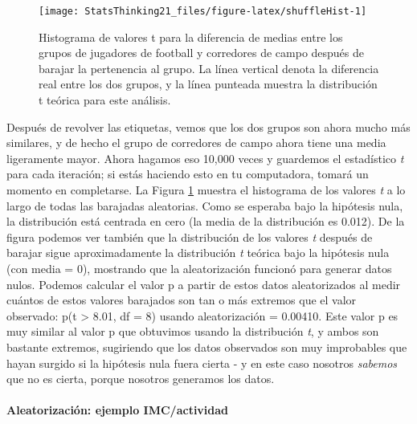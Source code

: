\documentclass[
  12pt,
]{book}
\theoremstyle{definition}
\theoremstyle{definition}
\theoremstyle{definition}
\theoremstyle{remark}
\begin{document}
\begin{figure}
\texttt{[image: StatsThinking21\_files/figure-latex/shuffleHist-1]} \caption{Histograma de valores t para la diferencia de medias entre los grupos de jugadores de football y corredores de campo después de barajar la pertenencia al grupo. La línea vertical denota la diferencia real entre los dos grupos, y la línea punteada muestra la distribución t teórica para este análisis.}\label{fig:shuffleHist}
\end{figure}

Después de revolver las etiquetas, vemos que los dos grupos son ahora mucho más similares, y de hecho el grupo de corredores de campo ahora tiene una media ligeramente mayor. Ahora hagamos eso 10,000 veces y guardemos el estadístico \emph{t} para cada iteración; si estás haciendo esto en tu computadora, tomará un momento en completarse. La Figura \ref{fig:shuffleHist} muestra el histograma de los valores \emph{t} a lo largo de todas las barajadas aleatorias. Como se esperaba bajo la hipótesis nula, la distribución está centrada en cero (la media de la distribución es 0.012). De la figura podemos ver también que la distribución de los valores \emph{t} después de barajar sigue aproximadamente la distribución \emph{t} teórica bajo la hipótesis nula (con media = 0), mostrando que la aleatorización funcionó para generar datos nulos. Podemos calcular el valor p a partir de estos datos aleatorizados al medir cuántos de estos valores barajados son tan o más extremos que el valor observado: p(t \textgreater{} 8.01, df = 8) usando aleatorización = 0.00410. Este valor p es muy similar al valor p que obtuvimos usando la distribución \emph{t}, y ambos son bastante extremos, sugiriendo que los datos observados son muy improbables que hayan surgido si la hipótesis nula fuera cierta - y en este caso nosotros \emph{sabemos} que no es cierta, porque nosotros generamos los datos.

\hypertarget{aleatorizaciuxf3n-ejemplo-imcactividad}{%
\paragraph{Aleatorización: ejemplo IMC/actividad}\label{aleatorizaciuxf3n-ejemplo-imcactividad}}
\end{document}
